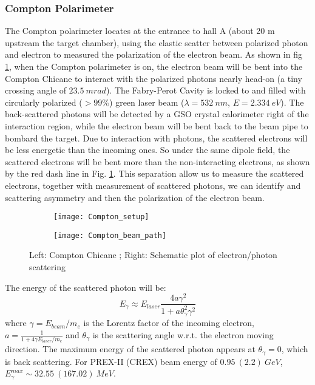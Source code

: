 \subsubsection{Compton Polarimeter}
The Compton polarimeter locates at the entrance to hall A (about 20 m upstream the 
target chamber), using the elastic scatter between polarized photon and electron
to measured the polarization of the electron beam. As shown in fig \ref{fig:compton_pol},
when the Compton polarimeter is on, the electron beam will be bent into the 
Compton Chicane to interact with the polarized photons nearly head-on (a tiny
crossing angle of $23.5\ mrad$). The Fabry-Perot Cavity
is locked to and filled with circularly polarized ($> 99\%$) green laser beam
($\lambda = 532\ nm$, $E = 2.334\ eV$).
The back-scattered photons will be detected by a GSO crystal calorimeter right 
of the interaction region, while the
electron beam will be bent back to the beam pipe to bombard the target. Due to
interaction with photons, the scattered electrons will be less energetic than
the incoming ones. So under the same dipole field, the scattered electrons will
be bent more than the non-interacting electrons, as shown by the red dash line 
in Fig. \ref{fig:compton_pol}. This 
separation allow us to measure the scattered electrons, together with measurement
of scattered photons, we can identify and scattering asymmetry and then the polarization
of the electron beam.
\begin{figure}[h!]
    \begin{subfigure}[c]{0.55\linewidth}
	\texttt{[image: Compton\_setup]}
    \end{subfigure}
    \begin{subfigure}[c]{0.55\linewidth}
	\texttt{[image: Compton\_beam\_path]}
    \end{subfigure}
    \caption{Left: Compton Chicane \cite{PhysRevSTAB.7.042802}; 
    Right: Schematic plot of electron/photon scattering} 
    \label{fig:compton_pol}
\end{figure}

The energy of the scattered photon will be:
\begin{equation}
    E_\gamma \approx E_{laser} \frac{4a\gamma^2}{1 + a\theta^2_\gamma \gamma^2}
\end{equation}
where $\gamma = E_{beam}/m_e$ is the Lorentz factor of the incoming electron, 
$a = \frac{1}{1 + 4\gamma E_{laser}/m_e}$ and $\theta_\gamma$ is the scattering
angle w.r.t. the electron moving direction. The maximum energy of the scattered
photon appears at $\theta_\gamma = 0$, which is back scattering. 
For PREX-II (CREX) beam energy of $0.95\ (2.2)\ GeV$, $E_\gamma^{max} \sim 32.55 \ (167.02)\ MeV$.

